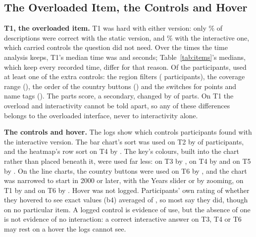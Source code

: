 \documentclass[10pt,twocolumn]{article}
\begin{document}
\subsection{The Overloaded Item, the Controls and Hover}
\label{sec:overload}

\textbf{T1, the overloaded item.} T1 was hard with either version: only \% of descriptions were correct with the static version, and \% with the interactive one, which carried  controls the question did not need. Over the times the time analysis keeps, T1's median time was  and  seconds; Table~\ref{tab:items}'s medians, which keep every recorded time, differ for that reason. Of the  participants,  used at least one of the extra controls: the region filters ( participants), the coverage range (), the order of the country buttons () and the switches for points and name tags (). The parts score, a secondary, changed by   of  parts. On T1 the overload and interactivity cannot be told apart, so any of these differences belongs to the overloaded interface, never to interactivity alone.

\textbf{The controls and hover.} The logs show which controls participants found with the interactive version. The bar chart's sort was used on T2 by  of  participants, and the heatmap's row sort on T4 by . The key's colours, built into the chart rather than placed beneath it, were used far less: on T3 by , on T4 by  and on T5 by . On the line charts, the country buttons were used on T6 by , and the chart was narrowed to start in 2000 or later, with the Years slider or by zooming, on T1 by  and on T6 by . Hover was not logged. Participants' own rating of whether they hovered to see exact values (b4) averaged  of , so most say they did, though on no particular item. A logged control is evidence of use, but the absence of one is not evidence of no interaction: a correct interactive answer on T3, T4 or T6 may rest on a hover the logs cannot see.
\end{document}
